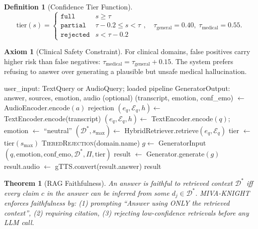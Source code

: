 \documentclass[12pt,a4paper]{article}
\theoremstyle{definition}
\newtheorem{definition}{Definition}[section]
\newtheorem{axiom}{Axiom}[section]
\theoremstyle{plain}
\newtheorem{theorem}{Theorem}[section]
\theoremstyle{remark}
\begin{document}
\begin{definition}[Confidence Tier Function]
\[
  \text{tier}(s) = \begin{cases}
    \texttt{full}     & s \ge \tau \\
    \texttt{partial}  & \tau - 0.2 \le s < \tau \\
    \texttt{rejected} & s < \tau - 0.2
  \end{cases}, \quad
  \tau_{\text{general}} = 0.40,\; \tau_{\text{medical}} = 0.55.
\]
\end{definition}

\begin{axiom}[Clinical Safety Constraint]
For clinical domains, false positives carry higher risk than false negatives:
$\tau_{\text{medical}} = \tau_{\text{general}} + 0.15$. The system prefers refusing to answer over generating a plausible but unsafe medical hallucination.
\end{axiom}

\begin{algorithm}[H]
\caption{Full Query Pipeline --- MIVA-KNIGHT Inference}
\label{alg:query}
\begin{algorithmic}[1]
\Require user\_input: TextQuery or AudioQuery; loaded pipeline
\Ensure GeneratorOutput: answer, sources, emotion, audio (optional)
  \State (transcript, emotion, conf\_emo) $\gets$ AudioEncoder.encode$(a)$
   \Return rejection \EndIf
  \State $(e_q, \mathcal{E}_q, h) \gets$ TextEncoder.encode(transcript)
\Else
  \State $(e_q, \mathcal{E}_q, h) \gets$ TextEncoder.encode$(q)$; emotion $\gets$ ``neutral''
\EndIf
{}  \EndIf
\State $(\mathcal{D}^*, s_{\max}) \gets$ HybridRetriever.retrieve$(e_q, \mathcal{E}_q)$
\State tier $\gets$ tier$(s_{\max})$
 \Return \textsc{TieredRejection}(domain.name) \EndIf
\State $g \gets$ GeneratorInput$(q, \text{emotion}, \text{conf\_emo}, \mathcal{D}^*, \Pi, \text{tier})$
\State result $\gets$ Generator.generate$(g)$
 result.audio $\gets$ gTTS.convert(result.answer) \EndIf
\State \Return result
\end{algorithmic}
\end{algorithm}

\begin{theorem}[RAG Faithfulness]
An answer is \emph{faithful} to retrieved context $\mathcal{D}^*$ iff every claim $c$ in the answer can be inferred from some $d_j \in \mathcal{D}^*$. MIVA-KNIGHT enforces faithfulness by: (1) prompting ``Answer using ONLY the retrieved context'', (2) requiring citation, (3) rejecting low-confidence retrievals before any LLM call.
\end{theorem}
\end{document}
